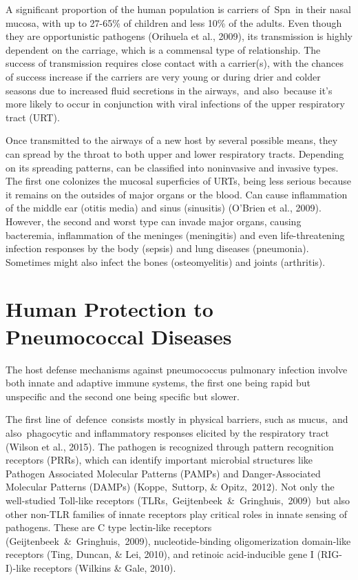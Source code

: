 \documentclass[
]{book}
\begin{document}
A significant proportion of the human population is carriers of~Spn~in their nasal mucosa, with up to 27-65\% of children and less 10\% of the adults. Even though they are opportunistic pathogens (Orihuela et al., 2009), its transmission is highly dependent on the carriage, which is a commensal type of relationship. The success of transmission requires close contact with a carrier(s), with the chances of success increase if the carriers are very young or during drier and colder seasons due to increased fluid secretions in the airways,~and also~because it's more likely to occur in conjunction with viral infections of the upper respiratory tract (URT).

Once transmitted to the airways of a new host by several possible means, they can spread by the throat to both upper and lower respiratory tracts. Depending on its spreading patterns, can be classified into noninvasive and invasive types. The first one colonizes the mucosal superficies of URTs, being less serious because it remains on the outsides of major organs or the blood. Can cause inflammation of the middle ear (otitis media) and sinus (sinusitis) (O'Brien et al., 2009). However, the second and worst type can invade major organs, causing bacteremia, inflammation of the meninges (meningitis) and even life-threatening infection responses by the body (sepsis) and lung diseases (pneumonia). Sometimes might also infect the bones (osteomyelitis) and joints (arthritis).

\hypertarget{human-protection-to-pneumococcal-diseases}{%
\section{Human Protection to Pneumococcal Diseases}\label{human-protection-to-pneumococcal-diseases}}

The host defense mechanisms against pneumococcus pulmonary infection involve both innate and adaptive immune systems, the first one being rapid but unspecific and the second one being specific but slower.

The first line of~defence~consists mostly in physical barriers, such as mucus,~and also~phagocytic and inflammatory responses elicited by the respiratory tract (Wilson et al., 2015). The pathogen is recognized through pattern recognition receptors (PRRs), which can identify important microbial structures like Pathogen Associated Molecular Patterns (PAMPs) and Danger-Associated Molecular Patterns (DAMPs) (Koppe,~Suttorp, \& Opitz,~2012)⁠. Not only the well-studied Toll-like receptors (TLRs,~Geijtenbeek~\&~Gringhuis,~2009)⁠~but also other non-TLR families of innate receptors play critical roles in innate sensing of pathogens. These are C type lectin-like receptors (Geijtenbeek~\&~Gringhuis,~2009)⁠, nucleotide-binding oligomerization domain-like receptors (Ting, Duncan, \& Lei, 2010)⁠, and retinoic acid-inducible gene I (RIG-I)-like receptors (Wilkins \& Gale, 2010)⁠.
\end{document}
